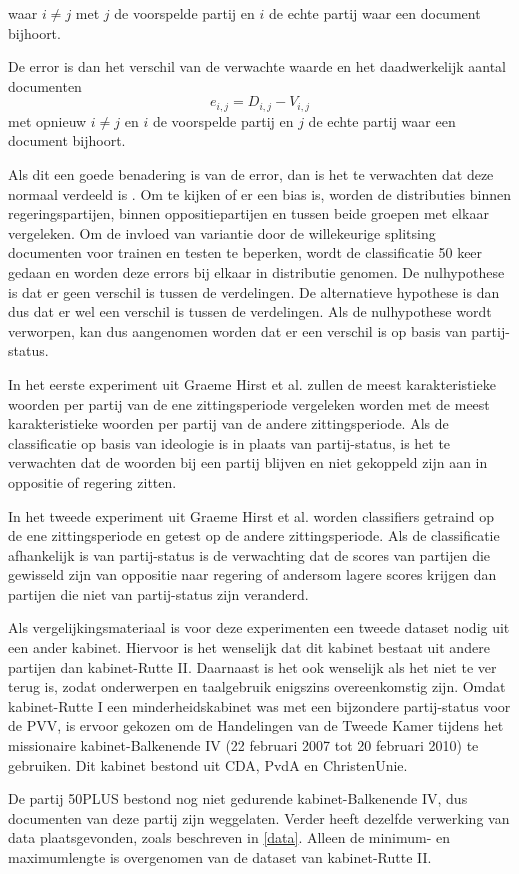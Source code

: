 waar $i\neq j$ met $j$ de voorspelde partij en $i$ de echte partij waar een document bijhoort.\par
De error is dan het verschil van de verwachte waarde en het daadwerkelijk aantal documenten
\begin{equation}
\label{eq:error}
e_{i,j} = D_{i,j} - V_{i,j}
\end{equation}
met opnieuw $i\neq j$ en $i$ de voorspelde partij en $j$ de echte partij waar een document bijhoort. \par
Als dit een goede benadering is van de error, dan is het te verwachten dat deze normaal verdeeld is \cite{citeulike:7531484}. Om te kijken of er een bias is, worden de distributies binnen regeringspartijen, binnen oppositiepartijen en tussen beide groepen met elkaar vergeleken. Om de invloed van variantie door de willekeurige splitsing documenten voor trainen en testen te beperken, wordt de classificatie 50 keer gedaan en worden deze errors bij elkaar in distributie genomen. De nulhypothese is dat er geen verschil is tussen de verdelingen. De alternatieve hypothese is dan dus dat er wel een verschil is tussen de verdelingen. Als de nulhypothese wordt verworpen, kan dus aangenomen worden dat er een verschil is op basis van partij-status.\par
In het eerste experiment uit Graeme Hirst et al. zullen de meest karakteristieke woorden per partij van de ene zittingsperiode vergeleken worden met de meest karakteristieke woorden per partij van de andere zittingsperiode. Als de classificatie op basis van ideologie is in plaats van partij-status, is het te verwachten dat de woorden bij een partij blijven en niet gekoppeld zijn aan in oppositie of regering zitten. \par
In het tweede experiment uit Graeme Hirst et al. worden classifiers getraind op de ene zittingsperiode en getest op de andere zittingsperiode. Als de classificatie afhankelijk is van partij-status is de verwachting dat de scores van partijen die gewisseld zijn van oppositie naar regering of andersom lagere scores krijgen dan partijen die niet van partij-status zijn veranderd.\par
Als vergelijkingsmateriaal is voor deze experimenten een tweede dataset nodig uit een ander kabinet. Hiervoor is het wenselijk dat dit kabinet bestaat uit andere partijen dan kabinet-Rutte II. Daarnaast is het ook wenselijk als het niet te ver terug is, zodat onderwerpen en taalgebruik enigszins overeenkomstig zijn. Omdat kabinet-Rutte I een minderheidskabinet was met een bijzondere partij-status voor de PVV, is ervoor gekozen om de Handelingen van de Tweede Kamer tijdens het missionaire kabinet-Balkenende IV (22 februari 2007 tot 20 februari 2010) te gebruiken. Dit kabinet bestond uit CDA, PvdA en ChristenUnie.\par
De partij 50PLUS bestond nog niet gedurende kabinet-Balkenende IV, dus documenten van deze partij zijn weggelaten. Verder heeft dezelfde verwerking van data plaatsgevonden, zoals beschreven in \ref{data}. Alleen de minimum- en maximumlengte is overgenomen van de dataset van kabinet-Rutte II.\par

